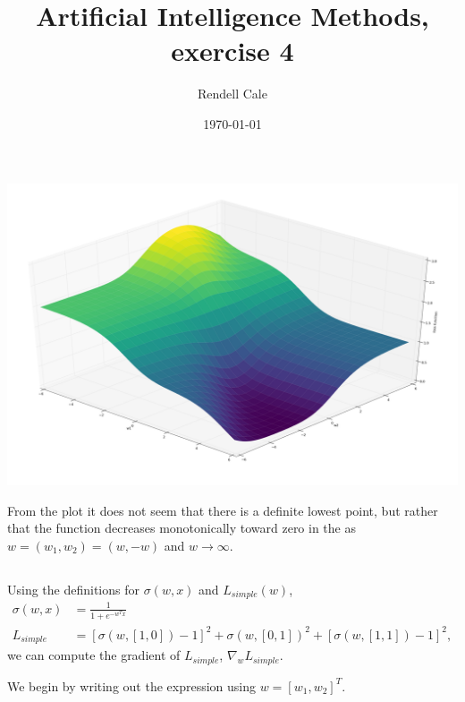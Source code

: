 \documentclass{article}
\title{Artificial Intelligence Methods, exercise 4}
\author{Rendell Cale}
\date{\today}
\begin{document}
\maketitle

\section{}
\begin{centering}
	\includegraphics[width=\linewidth]{exercise4_task1.png}
\end{centering}

From the plot it does not seem that there is a definite lowest point, but rather that the function decreases monotonically toward zero in the as $w=(w_1,w_2)=(w, -w)$ and $w \rightarrow \infty$. 

\subsection{}

\subsection{}
Using the definitions for $\sigma(w,x)$ and $L_{simple}(w)$,
\begin{align}
	\sigma(w,x) &= \frac{1}{1 + e^{-w^Tx}} \\
	L_{simple} &= \left[ \sigma(w,[1,0]) - 1 \right]^2 + \sigma(w,[0,1])^2 + \left[ \sigma(w,[1,1]) - 1 \right]^2,
\end{align}
we can compute the gradient of $L_{simple}$, $\nabla_w L_{simple}$.

We begin by writing out the expression using $w = [w_1, w_2]^T$.
\end{document}
